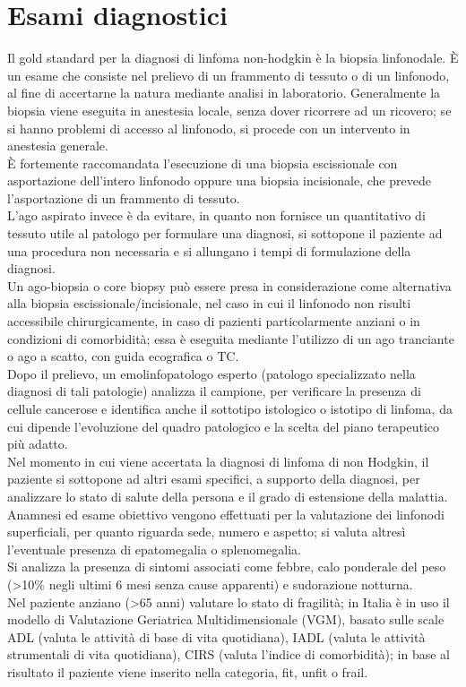 \section{Esami diagnostici}
Il gold standard per la diagnosi di linfoma non-hodgkin è la biopsia linfonodale. 
È un esame che consiste nel prelievo di un frammento di tessuto o di un linfonodo, al fine di 
accertarne la natura mediante analisi in laboratorio. 
Generalmente la biopsia viene eseguita in anestesia locale, senza dover ricorrere ad un ricovero; 
se si hanno problemi di accesso al linfonodo, si procede con un intervento in anestesia generale\cite{ISS}.\\
È fortemente raccomandata l’esecuzione di una biopsia escissionale con asportazione dell’intero linfonodo 
oppure una biopsia incisionale, che prevede l’asportazione di un frammento di tessuto\cite{AMERICANCANCER}.\\ 
L’ago aspirato invece è da evitare, in quanto non fornisce un quantitativo di tessuto utile al patologo per formulare 
una diagnosi, si sottopone il paziente ad una procedura non necessaria e si allungano i tempi di formulazione 
della diagnosi\cite{reteveneta}.\\
Un ago-biopsia o core biopsy può essere presa in considerazione come alternativa alla biopsia escissionale/incisionale,
nel caso in cui il linfonodo non risulti accessibile chirurgicamente, in caso di pazienti particolarmente anziani o in 
condizioni di comorbidità; essa è eseguita mediante l’utilizzo di un ago tranciante o ago a scatto, con guida 
ecografica o TC\cite{reteveneta}.\\
Dopo il prelievo, un emolinfopatologo esperto (patologo specializzato nella diagnosi di tali patologie) analizza 
il campione, per verificare la presenza di cellule cancerose e identifica anche il sottotipo 
istologico o istotipo di linfoma, da cui dipende l’evoluzione del quadro patologico e la scelta del piano 
terapeutico più adatto\cite{LLS}.\\

Nel momento in cui viene accertata la diagnosi di linfoma di non Hodgkin, il paziente si sottopone ad altri 
esami specifici, a supporto della diagnosi, per analizzare lo stato di salute della persona e il grado di 
estensione della malattia.\\
Anamnesi ed esame obiettivo vengono effettuati per la valutazione dei linfonodi superficiali, per quanto 
riguarda sede, numero e aspetto; si valuta altresì l'eventuale presenza di epatomegalia o splenomegalia.\\
Si analizza la presenza di sintomi associati come febbre, calo ponderale del peso 
(>10\% negli ultimi 6 mesi senza cause apparenti) e sudorazione notturna\cite{reteveneta}.\\
Nel paziente anziano (>65 anni) valutare lo stato di fragilità; in Italia è in uso il modello di 
Valutazione Geriatrica Multidimensionale (VGM), basato sulle scale ADL (valuta le attività di base di vita quotidiana),
IADL (valuta le attività strumentali di vita quotidiana), CIRS (valuta l’indice di comorbidità); 
in base al risultato il paziente viene inserito nella categoria, fit, unfit o frail\cite{AIOM}.

